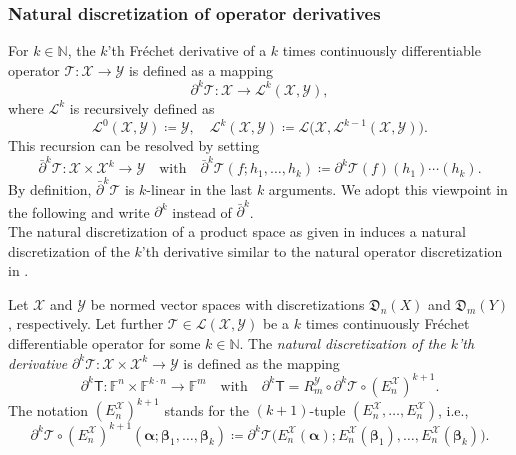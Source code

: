 \documentclass[a4paper]{paper}
\newcommand*{\SPC}[1]{{\ensuremath{\mathscr{#1}}}}
\newcommand*{\SPCL}{\SPC{L}}
\newcommand*{\SPCX}{\SPC{X}}
\newcommand*{\SPCY}{\SPC{Y}}
\newcommand*{\BLINOP}[2]{{\SPCL(#1, #2)}}
\newcommand*{\FIELD}{{\ensuremath{\mathbb{F}}}}
\newcommand*{\Fn}{{\ensuremath{\FIELD^n}}}
\newcommand*{\Fm}{{\ensuremath{\FIELD^m}}}
\newcommand{\NN}{{\ensuremath{\mathbb{N}}}}
\newcommand*{\OP}[1]{{\ensuremath{\mathcal{#1}}}}
\newcommand*{\OPT}{\OP{T}}
\newcommand{\DISCOP}[1]{{\ensuremath{\mathsf{#1}}}}
\newcommand*{\DISCOPT}{\DISCOP{T}}
\newcommand*{\EXT}[2]{\ensuremath{E_{#1}^{#2}}}
\newcommand*{\REST}[2]{\ensuremath{R_{#1}^{#2}}}
\newcommand*{\RmY}{{\ensuremath{\REST{m}{\SPC{Y}}}}}
\newcommand*{\EnX}{{\ensuremath{\EXT{n}{\SPC{X}}}}}
\newcommand*{\DISCR}[2]{{\ensuremath{\mathfrak{D}_{#1}(#2)}}}
\newcommand*{\DISCRnX}{\DISCR{n}{X}}
\newcommand*{\DISCRmY}{\DISCR{m}{Y}}
\DeclareMathOperator{\DEFEQ}{{\coloneqq}}
\newcommand*{\BDalpha}{\boldsymbol{\alpha}}
\newcommand*{\BDbeta}{\boldsymbol{\beta}}
\begin{document}
\subsubsection{Natural discretization of operator derivatives}
\label{subsubsec:discr:operator:op_deriv}

For $k \in \NN$, the $k$'th Fr\'{e}chet derivative of a $k$ times continuously differentiable operator 
$\OPT \colon \SPCX \to \SPCY$ is defined as a mapping
%
\begin{equation*}
 \partial^k \OPT \colon \SPCX \to \SPCL^k(\SPCX, \SPCY),
\end{equation*}
%
where $\SPCL^k$ is recursively defined as 
%
\begin{equation*}
 \SPCL^0(\SPCX, \SPCY) \DEFEQ  \SPCY, \quad 
 \SPCL^k(\SPCX, \SPCY) \DEFEQ  \SPCL\big( \SPCX, \SPCL^{k-1}(\SPCX, \SPCY) \big).
\end{equation*}
%
This recursion can be resolved by setting
%
\begin{equation*}
 \bar\partial^k \OPT \colon \SPCX \times \SPCX^k \to \SPCY
 \quad \text{with} \quad
 \bar\partial^k \OPT(f; h_1, \dots, h_k) \DEFEQ  \partial^k\OPT(f)(h_1)\cdots(h_k).
\end{equation*}
%
By definition, $\bar\partial^k\OPT$ is $k$-linear in the last $k$ arguments. We adopt this viewpoint in the following 
and write $\partial^k$ instead of $\bar\partial^k$.\\
%
The natural discretization of a product space as given in  induces a 
natural discretization of the $k$'th derivative similar to the natural operator discretization in 
.

\begin{definition}
 \label{def:discr:operator:op_deriv:operator_deriv_discr}
 Let $\SPCX$ and $\SPCY$ be normed vector spaces with discretizations $\DISCRnX$ and $\DISCRmY$, 
 respectively. Let further $\OPT \in \BLINOP{\SPCX}{\SPCY}$ be a $k$ times continuously Fr\'{e}chet 
 differentiable operator for some $k \in  \NN$. The \emph{natural discretization of the $k$'th derivative} 
 $\partial^k \OPT \colon \SPCX \times \SPCX^k \to \SPCY$ is defined as the mapping
 \begin{equation*}
  \partial^k \DISCOPT \colon \Fn \times \FIELD^{k\cdot n} \to \Fm
  \quad \text{with} \quad
  \partial^k \DISCOPT = \RmY \circ \partial^k \OPT \circ (\EnX)^{k+1}.
 \end{equation*}
 The notation $(\EnX)^{k+1}$ stands for the $(k+1)$-tuple $(\EnX, \dots, \EnX)$, i.e., 
 \begin{equation*}
  \partial^k \OPT \circ (\EnX)^{k+1}(\BDalpha; \BDbeta_1, \dots, \BDbeta_k) \DEFEQ 
 \partial^k \OPT\big( \EnX(\BDalpha); \EnX(\BDbeta_1), \dots, \EnX(\BDbeta_k) \big).
 \end{equation*}
\end{definition}
\end{document}
